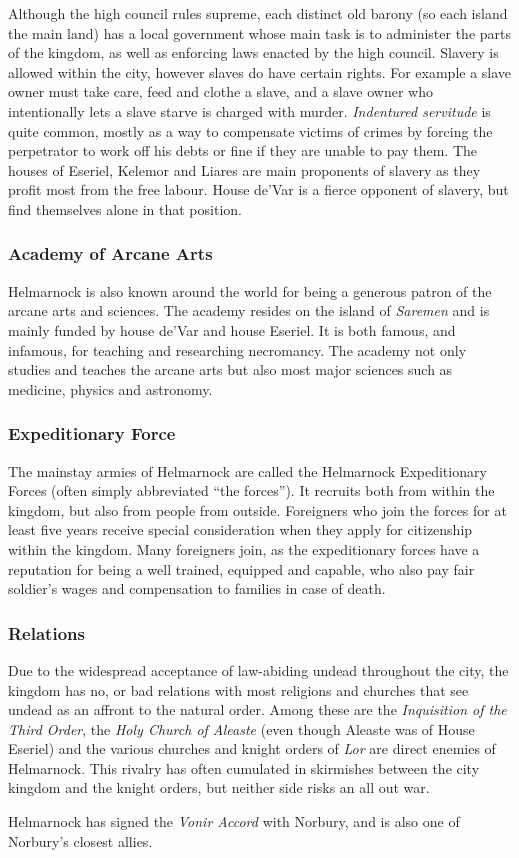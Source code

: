 Although the high council rules supreme, each distinct old barony (so each
island the main land) has a local government whose main task is to administer
the parts of the kingdom, as well as enforcing laws enacted by the high council.
Slavery is allowed within the city, however slaves do have certain rights. For
example a slave owner must take care, feed and clothe a slave, and a slave
owner who intentionally lets a slave starve is charged with murder.
\emph{Indentured servitude} is quite common, mostly as a way to compensate
victims of crimes by forcing the perpetrator to work off his debts or fine if
they are unable to pay them. The houses of Eseriel, Kelemor and Liares are main
proponents of slavery as they profit most from the free labour. House de'Var
is a fierce opponent of slavery, but find themselves alone in that position.

\subsubsection{Academy of Arcane Arts}

Helmarnock is also known around the world for being a generous patron of the
arcane arts and sciences. The academy resides on the island of \emph{Saremen}
and is mainly funded by house de'Var and house Eseriel. It is both famous,
and infamous, for teaching and researching necromancy. The academy not only
studies and teaches the arcane arts but also most major sciences such as
medicine, physics and astronomy.

\subsubsection{Expeditionary Force}

The mainstay armies of Helmarnock are called the Helmarnock Expeditionary
Forces (often simply abbreviated ``the forces''). It recruits both from
within the kingdom, but also from people from outside. Foreigners who join the
forces for at least five years receive special consideration when they apply for
citizenship within the kingdom. Many foreigners join, as the expeditionary
forces have a reputation for being a well trained, equipped and capable, who
also pay fair soldier's wages and compensation to families in case of death.

\subsubsection{Relations}

Due to the widespread acceptance of law-abiding undead throughout the city, the
kingdom has no, or bad relations with most religions and churches that see
undead as an affront to the natural order. Among these are the
\emph{Inquisition of the Third Order}, the \emph{Holy Church of Aleaste} (even
though Aleaste was of House Eseriel) and the various churches and knight
orders of \emph{Lor} are direct enemies of Helmarnock. This rivalry has often
cumulated in skirmishes between the city kingdom and the knight orders, but
neither side risks an all out war.

Helmarnock has signed the \emph{Vonir Accord} with Norbury, and is also one
of Norbury's closest allies.
